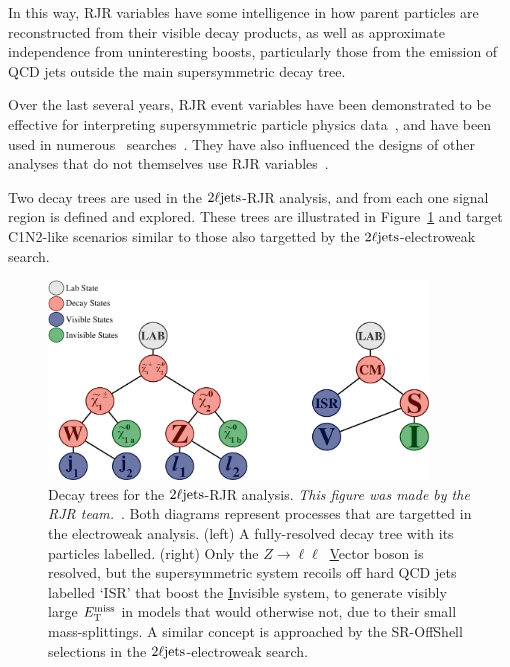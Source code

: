 In this way, RJR variables have some intelligence in how parent particles are
reconstructed from their visible decay products, as well as approximate
independence from uninteresting boosts, particularly those from the emission of
QCD jets outside the main supersymmetric decay tree.

Over the last several years, RJR event variables have been demonstrated to be
effective for interpreting supersymmetric particle physics
data~\cite{santoni2018probing},
and have been used in numerous \atlas\ searches~\cite{
atlas_rjr_SUSY_2016_07,
atlas_rjr_SUSY_2016_15,
atlas_rjr_SUSY_2016_16,
atlas_rjr_23l_SUSY_2017_03,
atlas_rjr_SUSY_2018_12,
atlas_rjr_EXOT_2019_19,
atlas_rjr_3l_SUSY_2019_09
}.
They have also influenced the designs of other analyses that do not themselves
use RJR variables~\cite{atlas_rjr_mimic_SUSY_2018_06}.

Two decay trees are used in the $\twoljets$-RJR analysis, and from each
one signal region is defined and explored.
These trees are illustrated in Figure~\ref{fig:2ljets_rjr_decay_trees} and
target C1N2-like scenarios similar to those also targetted by the
$\twoljets$-electroweak search.

\begin{figure}[tp]
\centering
\includegraphics[width=0.9\textwidth]{figures/2ljets_rjr_trees.pdf}
\caption[
Decay trees for the $\twoljets$-RJR analysis
]{%
Decay trees for the $\twoljets$-RJR analysis.
\emph{This figure was made by the RJR team.}~\cite{atlas2022searches}.
Both diagrams represent processes that are targetted in the electroweak
analysis.
(left) A fully-resolved decay tree with its particles labelled.
(right) Only the $Z\to\ell\ell~$ \underline{V}ector boson
is resolved, but the supersymmetric system recoils off
hard QCD jets labelled `ISR' that boost the \underline{I}nvisible system,
to generate visibly large $E_\mathrm{T}^\mathrm{miss}$ in models that would otherwise not,
due to their small mass-splittings.
A similar concept is approached by the SR-OffShell selections in the
$\twoljets$-electroweak search.
}
\label{fig:2ljets_rjr_decay_trees}
\end{figure}


